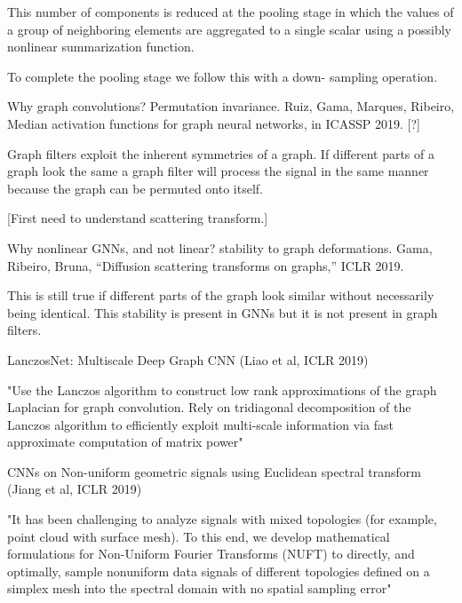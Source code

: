 \documentclass[english]{article}
\begin{document}
This number of components is reduced at the pooling stage in which the values of a group of neighboring elements are aggregated to a single
scalar using a possibly nonlinear summarization function.


To complete the pooling stage we follow this with a down-
sampling operation.



\item  Why graph convolutions? Permutation invariance. Ruiz, Gama, Marques, Ribeiro, Median activation functions for graph neural networks, in ICASSP 2019. [?]

Graph filters exploit the inherent symmetries of a graph. If different parts
of a graph look the same a graph filter will process the signal in the same manner because the graph can be
permuted onto itself. 

[First need to understand scattering transform.]

\item 

Why nonlinear GNNs, and not linear?  stability to graph deformations. 
Gama, Ribeiro, Bruna, “Diffusion scattering transforms on graphs,” ICLR 2019.

This is still true if different parts of the graph look
similar without necessarily being identical. This stability is present in GNNs but it is not present in graph
filters. 

\item LanczosNet: Multiscale Deep Graph CNN (Liao et al, ICLR 2019)

"Use the Lanczos algorithm to construct low rank approximations of the graph Laplacian for graph convolution. Rely on tridiagonal decomposition of the Lanczos algorithm to efficiently exploit multi-scale information via fast approximate computation of matrix power" 

\item CNNs on Non-uniform geometric signals using Euclidean spectral transform (Jiang et al, ICLR 2019)

"It has been challenging to analyze signals with
mixed topologies (for example, point cloud with surface mesh). To this end, we
develop mathematical formulations for Non-Uniform Fourier Transforms (NUFT)
to directly, and optimally, sample nonuniform data signals of different topologies
defined on a simplex mesh into the spectral domain with no spatial sampling
error"
\end{document}
